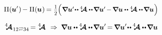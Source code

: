 \nopagebreak\vspace{-0.2em}
\begin{equation*}
\potentialenergydensity (
   \hspace{-0.1ex} \bm{u}' \hspace{.1ex}
) \hspace{-0.2ex}
- \potentialenergydensity (
   \hspace{-0.1ex} \bm{u} \hspace{.1ex}
) \hspace{-0.2ex}
= \smalldisplaystyleonehalf \hspace{-0.1ex}
\scalebox{.95}{$
  \Bigl( \hspace{.1ex}
    \boldnabla \bm{u}'
    \hspace{-0.4ex} \dotdotp \hspace{-0.1ex}
    \stiffnesstensor
    \dotdotp \hspace{-0.25ex}
    \boldnabla \bm{u}'
    \hspace{-0.25ex} - \hspace{-0.2ex}
    \boldnabla \bm{u}
    \dotdotp
    \stiffnesstensor
    \dotdotp \hspace{-0.25ex}
    \boldnabla \bm{u}
  \hspace{.1ex} \Bigr)
$}
\end{equation*}

\begin{equation*}
\stiffnesstensor_{\hspace{.12ex} \indexjuggling{12}{34}} \hspace{-0.25ex}
= \stiffnesstensor
\hspace{.4em}\Rightarrow\hspace{.25em}
\boldnabla \bm{u}
\dotdotp \hspace{-0.1ex}
\stiffnesstensor
\dotdotp \hspace{-0.25ex}
\boldnabla \bm{u}' \hspace{-0.25ex}
= \hspace{-0.2ex}
\boldnabla \bm{u}'
\hspace{-0.4ex} \dotdotp \hspace{-0.1ex}
\stiffnesstensor
\dotdotp \hspace{-0.25ex}
\boldnabla \bm{u}
\end{equation*}

